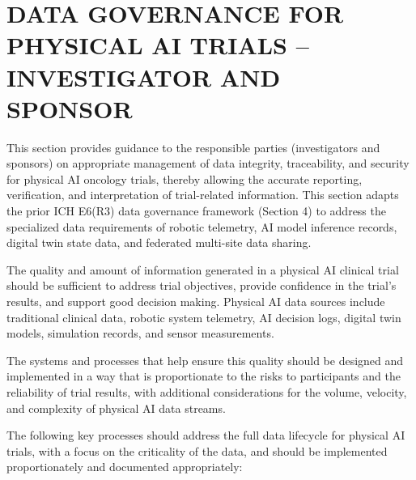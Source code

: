 \section{DATA GOVERNANCE FOR PHYSICAL AI TRIALS -- INVESTIGATOR AND SPONSOR}

This section provides guidance to the responsible parties (investigators and sponsors) on appropriate management of data integrity, traceability, and security for physical AI oncology trials, thereby allowing the accurate reporting, verification, and interpretation of trial-related information. This section adapts the prior ICH E6(R3) data governance framework (Section 4) to address the specialized data requirements of robotic telemetry, AI model inference records, digital twin state data, and federated multi-site data sharing.

The quality and amount of information generated in a physical AI clinical trial should be sufficient to address trial objectives, provide confidence in the trial's results, and support good decision making. Physical AI data sources include traditional clinical data, robotic system telemetry, AI decision logs, digital twin models, simulation records, and sensor measurements.

The systems and processes that help ensure this quality should be designed and implemented in a way that is proportionate to the risks to participants and the reliability of trial results, with additional considerations for the volume, velocity, and complexity of physical AI data streams.

The following key processes should address the full data lifecycle for physical AI trials, with a focus on the criticality of the data, and should be implemented proportionately and documented appropriately:

